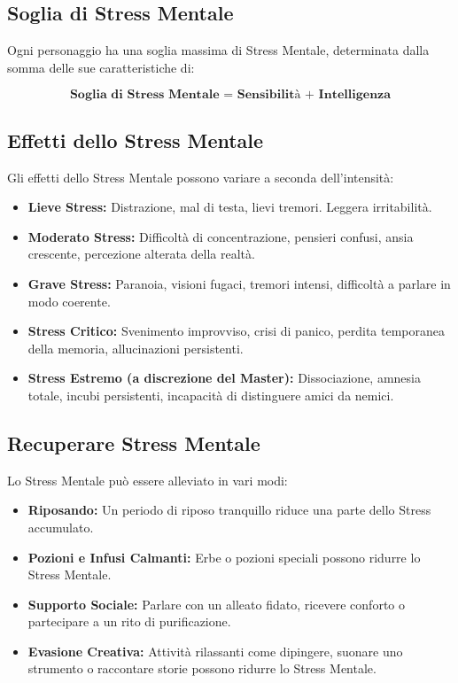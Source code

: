 \documentclass[../manuale_main.tex]{subfiles}
\begin{document}
\subsection{Soglia di Stress Mentale}
Ogni personaggio ha una soglia massima di Stress Mentale, determinata dalla somma delle sue caratteristiche di:

\[
\textbf{Soglia di Stress Mentale = Sensibilità + Intelligenza}
\]

\subsection{Effetti dello Stress Mentale}
Gli effetti dello Stress Mentale possono variare a seconda dell'intensità:

\begin{itemize}
\item \textbf{Lieve Stress:} Distrazione, mal di testa, lievi tremori. Leggera irritabilità.
\item \textbf{Moderato Stress:} Difficoltà di concentrazione, pensieri confusi, ansia crescente, percezione alterata della realtà.
\item \textbf{Grave Stress:} Paranoia, visioni fugaci, tremori intensi, difficoltà a parlare in modo coerente.
\item \textbf{Stress Critico:} Svenimento improvviso, crisi di panico, perdita temporanea della memoria, allucinazioni persistenti.
\item \textbf{Stress Estremo (a discrezione del Master):} Dissociazione, amnesia totale, incubi persistenti, incapacità di distinguere amici da nemici.
\end{itemize}

\subsection{Recuperare Stress Mentale}
Lo Stress Mentale può essere alleviato in vari modi:
\begin{itemize}
    \item \textbf{Riposando:} Un periodo di riposo tranquillo riduce una parte dello Stress accumulato.
    \item \textbf{Pozioni e Infusi Calmanti:} Erbe o pozioni speciali possono ridurre lo Stress Mentale.
    \item \textbf{Supporto Sociale:} Parlare con un alleato fidato, ricevere conforto o partecipare a un rito di purificazione.
    \item \textbf{Evasione Creativa:} Attività rilassanti come dipingere, suonare uno strumento o raccontare storie possono ridurre lo Stress Mentale.
\end{itemize}
\end{document}
